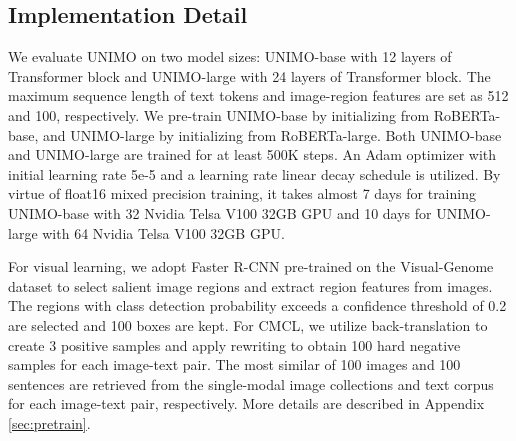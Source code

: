 \documentclass[11pt,a4paper]{article}
\begin{document}
\subsection{Implementation Detail}
\label{ssec:imp}
We evaluate UNIMO on two model sizes: UNIMO-base with 12 layers of Transformer block and UNIMO-large with 24 layers of Transformer block. 
The maximum sequence length of text tokens and image-region features are set as 512 and 100, respectively. 
We pre-train UNIMO-base by initializing from RoBERTa-base, and UNIMO-large by initializing from RoBERTa-large. 
Both UNIMO-base and UNIMO-large are trained for at least 500K steps.
An Adam optimizer with initial learning rate 5e-5 and a learning rate linear decay schedule is utilized.
By virtue of float16 mixed precision training, it takes almost 7 days for training UNIMO-base with 32 Nvidia Telsa V100 32GB GPU and 10 days for UNIMO-large with 64 Nvidia Telsa V100 32GB GPU.


For visual learning, we adopt Faster R-CNN \citep{ren2016faster} pre-trained on the Visual-Genome dataset to select salient image regions and extract region features from images.
The regions with class detection probability exceeds a confidence threshold of 0.2 are selected and 100 boxes are kept.
For CMCL, we utilize back-translation to create 3 positive samples and apply rewriting to obtain 100 hard negative samples for each image-text pair.
The most similar of 100 images and 100 sentences are retrieved from the single-modal image collections and text corpus for each image-text pair, respectively.
More details are described in Appendix \ref{sec:pretrain}.
\end{document}
